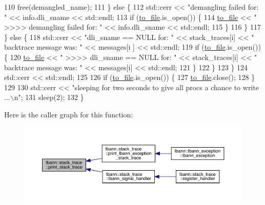 \begin{DoxyCode}
110         free(demangled\_name);
111       \} \textcolor{keywordflow}{else} \{
112         std::cerr << \textcolor{stringliteral}{"demangling failed for: "} << info.dli\_sname << std::endl;
113         \textcolor{keywordflow}{if} (\hyperlink{namespacelbann_1_1stack__trace_a6c838c74fec7cc57e5ccad283a8d282b}{to\_file}.is\_open()) \{
114           \hyperlink{namespacelbann_1_1stack__trace_a6c838c74fec7cc57e5ccad283a8d282b}{to\_file} << \textcolor{stringliteral}{"  >>>> demangling failed for: "} << info.dli\_sname << std::endl;
115         \}
116       \}
117     \} \textcolor{keywordflow}{else} \{
118       std::cerr << \textcolor{stringliteral}{"dli\_sname == NULL for: "} << stack\_traces[i] << \textcolor{stringliteral}{" backtrace message was: "} << messages[i
      ] << std::endl;
119       \textcolor{keywordflow}{if} (\hyperlink{namespacelbann_1_1stack__trace_a6c838c74fec7cc57e5ccad283a8d282b}{to\_file}.is\_open()) \{
120         \hyperlink{namespacelbann_1_1stack__trace_a6c838c74fec7cc57e5ccad283a8d282b}{to\_file} << \textcolor{stringliteral}{"  >>>> dli\_sname == NULL for: "} << stack\_traces[i] << \textcolor{stringliteral}{" backtrace message was: "}
       << messages[i] << std::endl;
121       \}
122     \}
123   \}
124   std::cerr << std::endl;
125 
126   \textcolor{keywordflow}{if} (\hyperlink{namespacelbann_1_1stack__trace_a6c838c74fec7cc57e5ccad283a8d282b}{to\_file}.is\_open()) \{
127     \hyperlink{namespacelbann_1_1stack__trace_a6c838c74fec7cc57e5ccad283a8d282b}{to\_file}.close();
128   \}
129 
130   std::cerr << \textcolor{stringliteral}{"sleeping for two seconds to give all procs a chance to write ...\(\backslash\)n"};
131   sleep(2);
132 \}
\end{DoxyCode}
Here is the caller graph for this function\+:\nopagebreak
\begin{figure}[H]
\begin{center}
\leavevmode
\includegraphics[width=350pt]{namespacelbann_1_1stack__trace_a52adbb11fce7541e2bc34b712d09e868_icgraph}
\end{center}
\end{figure}
\mbox{\label{namespacelbann_1_1stack__trace_a12c3aa60ec15015b925249fc61352f07}} 
